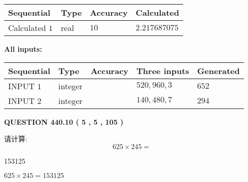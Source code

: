 \documentclass{ctexart}
\begin{document}
   
  
  
\noindent\begin{tabular}{|l|l|l|l|}
\hline
 Sequential & Type & Accuracy & Calculated \\ 
\hline
 
 
  Calculated $  1 $ & real & $  10  $ & 
 $ 2.217687075 $ 
 \\  \hline  
 \end{tabular}
   
   
   
   
\noindent\vspace{0.1in}\hspace{-0.08in} {\textbf{\Large{All inputs: }}}
   
   
  
  
\noindent\begin{tabular}{|l|l|l|l|l|}
\hline
 Sequential & Type & Accuracy & Three inputs & Generated \\ 
\hline
 
 
  INPUT $  1 $ & integer &  & $
 520
 , 
 960
 , 
 3
 $ & $ 652 $ 
 \\  \hline  
 
 
  INPUT $  2 $ & integer &  & $
 140
 , 
 480
 , 
 7
 $ & $ 294 $ 
 \\  \hline  
 \end{tabular}
   
   
  
\vspace{0.2in}
  
{\textbf{\Large{QUESTION
440.10 
 ( 5 , 5 , 105 )
}}}
  
  
 
请计算:
\begin{equation}
625  \times    %
245 = \nonumber
\end{equation}
 
 
 
\noindent{}
 
 

153125
 
 
\noindent{}
 
 

 
 
 
\noindent{}
 
 

$ %
625 \times  %
245=   %
153125$
 
\end{document}
